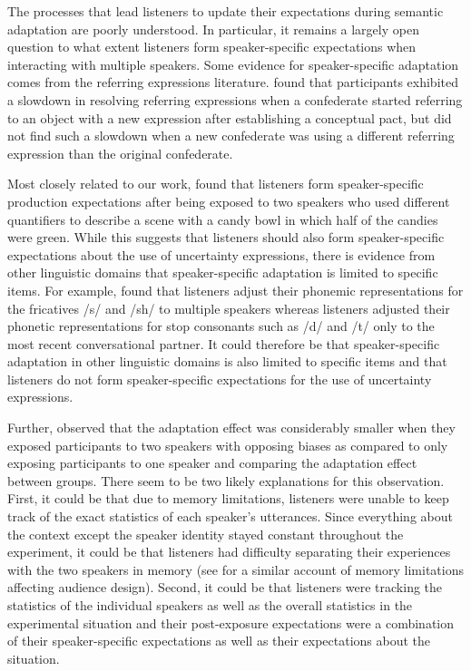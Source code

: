 The processes that lead listeners to update their expectations during semantic adaptation
are poorly understood. In particular, it remains a largely open question to what extent listeners form speaker-specific
expectations when interacting with multiple speakers. Some evidence for speaker-specific
adaptation comes from the referring expressions literature. \cite{Metzing2003} found that 
participants exhibited a slowdown in resolving referring expressions
when a confederate started referring to an object with a new expression 
after establishing a conceptual pact, but did not find such a slowdown 
when a new confederate was using a different referring expression 
than the original confederate. 

Most closely related to our work, \cite{Yildirim2016} found that listeners 
form speaker-specific production expectations after being exposed to 
two speakers who used different 
quantifiers to describe a scene with a candy bowl
in which half of the candies were green. While this suggests
that listeners should also form speaker-specific expectations
about the use of uncertainty expressions, there is evidence from
other linguistic domains that speaker-specific adaptation is limited to specific items.
For example, \cite{Kraljic2007} found that listeners adjust their phonemic
representations for the fricatives /s/ and /sh/ to multiple speakers whereas listeners
adjusted their phonetic representations for stop consonants such as /d/ and /t/ only
to the most recent conversational partner. It could therefore be that speaker-specific adaptation
in other linguistic domains is also limited to specific items and that listeners do not
form speaker-specific expectations for the use of uncertainty expressions.

Further, \cite{Yildirim2016} observed that the adaptation effect was considerably smaller
when they exposed participants to two speakers with opposing biases as compared 
to only exposing participants to one speaker and comparing the adaptation 
effect between groups. There seem to be two likely explanations for this observation.
First, it could be that due to memory limitations, listeners were unable 
to keep track of the exact statistics of each speaker's utterances. Since
everything about the context except the speaker identity stayed constant
throughout the experiment, it could be that listeners had difficulty 
separating their experiences with the two speakers in memory (see \cite{Horton2005} for 
a similar account of memory limitations affecting audience design). Second, it
could be that listeners were tracking the statistics of the individual speakers as
well as the overall statistics in the experimental situation and their post-exposure
expectations were a combination of their speaker-specific expectations as well as 
their expectations about the situation.

